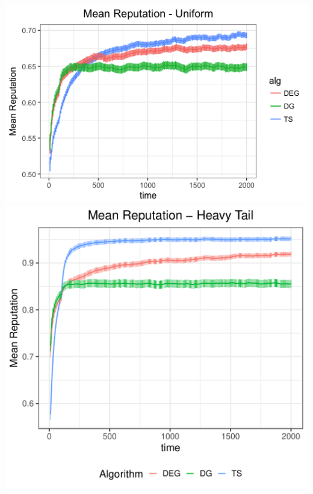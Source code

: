 \documentclass[../competing_bandits_with_appendix.tex]{subfiles}
\begin{document}
\begin{center}
\includegraphics[scale=0.35]{ec19paper/appendix_figures/uniform_mean}
\includegraphics[scale=0.35]{ec19paper/appendix_figures/ht_mean}
\end{center}
\end{document}
